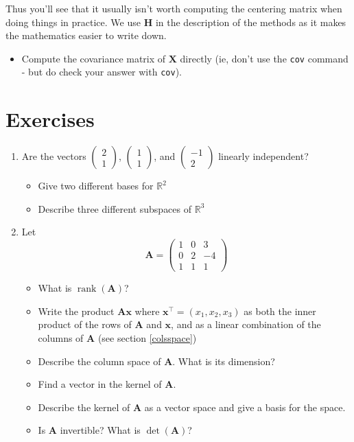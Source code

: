 \documentclass[]{book}
\providecommand{\tightlist}{%
  \setlength{\itemsep}{0pt}\setlength{\parskip}{0pt}}
\theoremstyle{definition}
\theoremstyle{definition}
\theoremstyle{definition}
\theoremstyle{remark}
\begin{document}
Thus you'll see that it usually isn't worth computing the centering matrix when doing things in practice. We use \(\mathbf H\) in the description of the methods as it makes the mathematics easier to write down.

\begin{itemize}
\tightlist
\item
  Compute the covariance matrix of \(\mathbf X\) directly (ie, don't use the \texttt{cov} command - but do check your answer with \texttt{cov}).
\end{itemize}

\hypertarget{exercises-ch2}{%
\section{Exercises}\label{exercises-ch2}}

\begin{enumerate}
\def\labelenumi{\arabic{enumi}.}
\item
  Are the vectors \(\left( \begin{array}{c}2\\1\end{array}\right)\), \(\left( \begin{array}{c}1\\1\end{array}\right)\), and \(\left( \begin{array}{c}-1\\2\end{array}\right)\) linearly independent?

  \begin{itemize}
  \tightlist
  \item
    Give two different bases for \(\mathbb{R}^2\)
  \item
    Describe three different subspaces of \(\mathbb{R}^3\)
  \end{itemize}
\item
  Let \[\mathbf A= \left(\begin{array}{ccc}1&0&3\\
  0&2&-4\\
  1&1&1
  \end{array}\right)\]

  \begin{itemize}
  \tightlist
  \item
    What is \(\operatorname{rank}(\mathbf A)\)?
  \item
    Write the product \(\mathbf A\mathbf x\) where \(\mathbf x^\top=(x_1, x_2, x_3)\) as both the inner product of the rows of \(\mathbf A\) and \(\mathbf x\), and as a linear combination of the columns of \(\mathbf A\) (see section \ref{colsspace})
  \item
    Describe the column space of \(\mathbf A\). What is its dimension?
  \item
    Find a vector in the kernel of \(\mathbf A\).
  \item
    Describe the kernel of \(\mathbf A\) as a vector space and give a basis for the space.
  \item
    Is \(\mathbf A\) invertible? What is \(\det(\mathbf A)\)?
  \end{itemize}
\end{enumerate}
\end{document}
